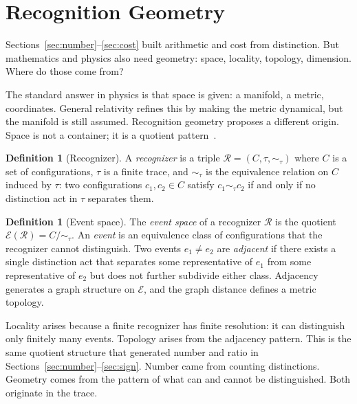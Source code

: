 \documentclass[11pt,a4paper]{article}
\theoremstyle{definition}
\newtheorem{definition}[theorem]{Definition}
\theoremstyle{remark}
\begin{document}
\section{Recognition Geometry}\label{sec:geometry}

Sections~\ref{sec:number}--\ref{sec:cost} built arithmetic and cost from
distinction. But mathematics and physics also need geometry: space, locality,
topology, dimension. Where do those come from?

The standard answer in physics is that space is given: a manifold, a metric,
coordinates. General relativity refines this by making the metric dynamical,
but the manifold is still assumed. Recognition geometry
proposes a different origin. Space is not a container; it is a quotient
pattern~\cite{Washburn2026Geometry}.

\begin{definition}[Recognizer]\label{def:recognizer}
A \emph{recognizer} is a triple $\mathcal{R} = (C, \tau, \sim_\tau)$ where
$C$ is a set of configurations, $\tau$ is a finite trace, and
$\sim_\tau$ is the equivalence relation on $C$ induced by $\tau$: two
configurations $c_1, c_2 \in C$ satisfy $c_1 \sim_\tau c_2$ if and only if
no distinction act in $\tau$ separates them.
\end{definition}

\begin{definition}[Event space]\label{def:event}
The \emph{event space} of a recognizer $\mathcal{R}$ is the quotient
$\mathcal{E}(\mathcal{R}) = C / {\sim_\tau}$. An \emph{event} is an
equivalence class of configurations that the recognizer cannot distinguish.
Two events $e_1 \neq e_2$ are \emph{adjacent} if there exists a single
distinction act that separates some representative of $e_1$ from some
representative of $e_2$ but does not further subdivide either class.
Adjacency generates a graph structure on $\mathcal{E}$, and the graph
distance defines a metric topology.
\end{definition}

Locality arises because a finite recognizer has finite resolution: it can
distinguish only finitely many events. Topology arises from the adjacency
pattern. This is the same quotient structure that generated number and ratio
in Sections~\ref{sec:number}--\ref{sec:sign}. Number came from counting
distinctions. Geometry comes from the pattern of what can and cannot be
distinguished. Both originate in the trace.
\end{document}
